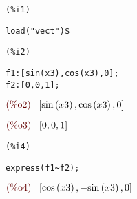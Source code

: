 \noindent
\begin{minipage}[t]{8ex}
\color{red}\bf
\begin{verbatim}
(%i1) 
\end{verbatim}
\end{minipage}
\begin{minipage}[t]{\textwidth}
\color{blue}
\begin{verbatim}
load("vect")$
\end{verbatim}
\end{minipage}

\smallskip

\noindent
\begin{minipage}[t]{8ex}
\color{red}\bf
\begin{verbatim}
(%i2) 
\end{verbatim}
\end{minipage}
\begin{minipage}[t]{\textwidth}
\color{blue}
\begin{verbatim}
f1:[sin(x3),cos(x3),0];
f2:[0,0,1];
\end{verbatim}
\end{minipage}
\begin{math}\displaystyle
\parbox{8ex}{\color{labelcolor}(\%o2) }
[\mathrm{sin}\left( x3\right) ,\mathrm{cos}\left( x3\right) ,0]
\end{math}

\noindent
\begin{math}\displaystyle
\parbox{8ex}{\color{labelcolor}(\%o3) }
[0,0,1]
\end{math}


\noindent
\begin{minipage}[t]{8ex}
\color{red}\bf
\begin{verbatim}
(%i4) 
\end{verbatim}
\end{minipage}
\begin{minipage}[t]{\textwidth}
\color{blue}
\begin{verbatim}
express(f1~f2);
\end{verbatim}
\end{minipage}
\begin{math}\displaystyle
\parbox{8ex}{\color{labelcolor}(\%o4) }
[\mathrm{cos}\left( x3\right) ,-\mathrm{sin}\left( x3\right) ,0]
\end{math}
